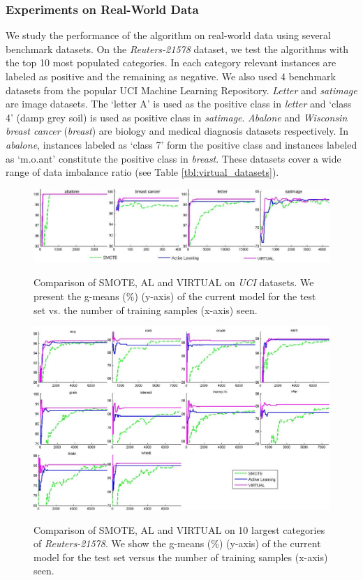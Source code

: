 \subsubsection{Experiments on Real-World Data}
We study the performance of the algorithm on real-world data using several benchmark datasets. On the \emph{Reuters-21578} dataset, we test the algorithms with the top 10 most populated categories. In each category relevant instances are labeled as positive and the remaining as negative. We also used 4 benchmark datasets from the popular UCI Machine Learning Repository. \emph{Letter} and \emph{satimage} are image datasets. The `letter A' is used as the positive class in \emph{letter} and `class 4' (damp grey soil) is used as positive class in \emph{satimage}. \emph{Abalone} and \emph{Wisconsin breast cancer} (\emph{breast}) are biology and medical diagnosis datasets respectively. In \emph{abalone}, instances labeled as `class 7' form the positive class and instances labeled as `m.o.ant' constitute the positive class in \emph{breast}. These datasets cover a wide range of data imbalance ratio (see Table \ref{tbl:virtual_datasets}).

\begin{figure}[!b]
  \centering
  \scalebox{1}
  {\includegraphics[width=\textwidth]{Figures/virtual/uci-graphs.eps}}\\
  \caption{Comparison of SMOTE, AL and VIRTUAL on \emph{UCI} datasets.
  We present the g-means (\%) (y-axis) of the current model for the test set
  vs. the number of training samples (x-axis) seen.}
  \label{fig:uci}
\end{figure}

\begin{figure}[!b]
  \centering
  \scalebox{1}
  {\includegraphics[width=\textwidth]{Figures/virtual/reuters.eps}}\\
  \caption{Comparison of SMOTE, AL and VIRTUAL on 10 largest categories of \emph{Reuters-21578}.
  We show the g-means (\%) (y-axis) of the current model for the test set
  versus the number of training samples (x-axis) seen.}
  \label{fig:reuters}
\end{figure}


